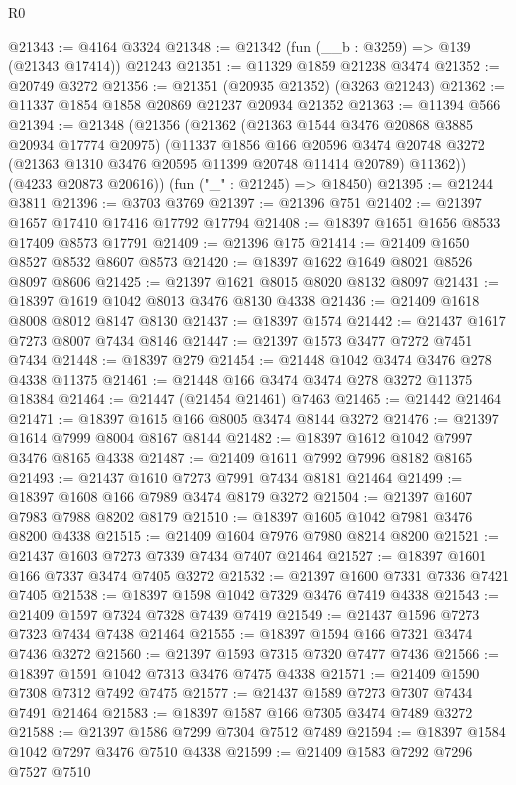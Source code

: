 \begin{lexlean}{R0}
\begin{coremodule}
@21343 := @4164 @3324
@21348 := @21342 (fun (__b : @3259) => @139 (@21343 @17414)) @21243
@21351 := @11329 @1859 @21238 @3474
@21352 := @20749 @3272
@21356 := @21351 (@20935 @21352) (@3263 @21243)
@21362 := @11337 @1854 @1858 @20869 @21237 @20934 @21352
@21363 := @11394 @566
@21394 := @21348
    (@21356
      (@21362
        (@21363 @1544 @3476 @20868 @3885 @20934 @17774 @20975)
        (@11337
          @1856
          @166
          @20596
          @3474
          @20748
          @3272
          (@21363 @1310 @3476 @20595 @11399 @20748 @11414 @20789)
          @11362))
      (@4233 @20873 @20616))
    (fun ("_" : @21245) => @18450)
@21395 := @21244 @3811
@21396 := @3703 @3769
@21397 := @21396 @751
@21402 := @21397 @1657 @17410 @17416 @17792 @17794
@21408 := @18397 @1651 @1656 @8533 @17409 @8573 @17791
@21409 := @21396 @175
@21414 := @21409 @1650 @8527 @8532 @8607 @8573
@21420 := @18397 @1622 @1649 @8021 @8526 @8097 @8606
@21425 := @21397 @1621 @8015 @8020 @8132 @8097
@21431 := @18397 @1619 @1042 @8013 @3476 @8130 @4338
@21436 := @21409 @1618 @8008 @8012 @8147 @8130
@21437 := @18397 @1574
@21442 := @21437 @1617 @7273 @8007 @7434 @8146
@21447 := @21397 @1573 @3477 @7272 @7451 @7434
@21448 := @18397 @279
@21454 := @21448 @1042 @3474 @3476 @278 @4338 @11375
@21461 := @21448 @166 @3474 @3474 @278 @3272 @11375 @18384
@21464 := @21447 (@21454 @21461) @7463
@21465 := @21442 @21464
@21471 := @18397 @1615 @166 @8005 @3474 @8144 @3272
@21476 := @21397 @1614 @7999 @8004 @8167 @8144
@21482 := @18397 @1612 @1042 @7997 @3476 @8165 @4338
@21487 := @21409 @1611 @7992 @7996 @8182 @8165
@21493 := @21437 @1610 @7273 @7991 @7434 @8181 @21464
@21499 := @18397 @1608 @166 @7989 @3474 @8179 @3272
@21504 := @21397 @1607 @7983 @7988 @8202 @8179
@21510 := @18397 @1605 @1042 @7981 @3476 @8200 @4338
@21515 := @21409 @1604 @7976 @7980 @8214 @8200
@21521 := @21437 @1603 @7273 @7339 @7434 @7407 @21464
@21527 := @18397 @1601 @166 @7337 @3474 @7405 @3272
@21532 := @21397 @1600 @7331 @7336 @7421 @7405
@21538 := @18397 @1598 @1042 @7329 @3476 @7419 @4338
@21543 := @21409 @1597 @7324 @7328 @7439 @7419
@21549 := @21437 @1596 @7273 @7323 @7434 @7438 @21464
@21555 := @18397 @1594 @166 @7321 @3474 @7436 @3272
@21560 := @21397 @1593 @7315 @7320 @7477 @7436
@21566 := @18397 @1591 @1042 @7313 @3476 @7475 @4338
@21571 := @21409 @1590 @7308 @7312 @7492 @7475
@21577 := @21437 @1589 @7273 @7307 @7434 @7491 @21464
@21583 := @18397 @1587 @166 @7305 @3474 @7489 @3272
@21588 := @21397 @1586 @7299 @7304 @7512 @7489
@21594 := @18397 @1584 @1042 @7297 @3476 @7510 @4338
@21599 := @21409 @1583 @7292 @7296 @7527 @7510

\end{coremodule}
\end{lexlean}
